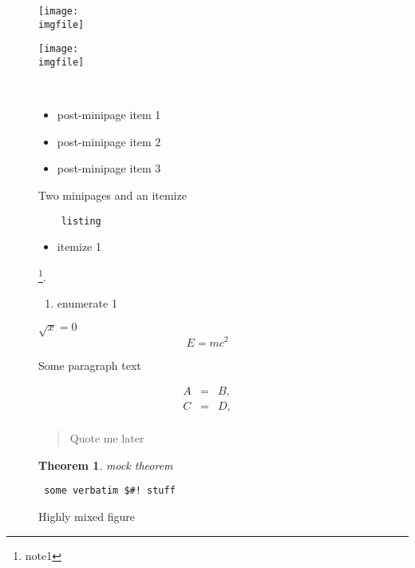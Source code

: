 \documentclass{article}
\newtheorem{theorem}{Theorem}
\def\imgfile{../graphics/none.png}
\begin{document}
\begin{figure}
  \begin{minipage}[t]{0.4\textwidth}
    \texttt{[image: \\imgfile]}
  \end{minipage}
  \begin{minipage}[t]{0.4\textwidth}
    \texttt{[image: \\imgfile]}
  \end{minipage} \\
  \begin{center}\begin{itemize}
    \item post-minipage item 1
    \item post-minipage item 2
    \item post-minipage item 3
  \end{itemize}\end{center}
  \caption{Two minipages and an itemize}
\end{figure}
\clearpage

\begin{figure}
  \begin{lstlisting}
    listing
  \end{lstlisting}%
  \begin{itemize}\item itemize 1 \end{itemize}\footnote{note1}.%
  \begin{enumerate}\item enumerate 1 \end{enumerate}%
  $ \sqrt{x} = 0 $%
  \[ E = mc^2 \]%

  Some paragraph text

  \begin{eqnarray*}
    A&=&B,\\
    C&=&D,\\
  \end{eqnarray*}
  \begin{quote}Quote me later\end{quote}%
  \begin{theorem} mock theorem \end{theorem}%
  \begin{verbatim} some verbatim $#! stuff \end{verbatim}%
  \caption{Highly mixed figure}
\end{figure}
\clearpage
\end{document}
